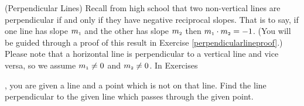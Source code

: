 {
\label{perpendicularlines}

\noindent (Perpendicular Lines)  Recall from high school that two non-vertical lines are perpendicular if and only if they have negative reciprocal slopes.  That is to say, if one line has slope $m_{\mbox{\tiny$1$}}$ and the other has slope $m_{\mbox{\tiny$2$}}$ then $m_{\mbox{\tiny$1$}} \cdot m_{\mbox{\tiny$2$}} = -1$.  (You will be guided through a proof of this result in Exercise \ref{perpendicularlineproof}.)  Please note that a horizontal line is perpendicular to a vertical line and vice versa, so we assume $m_{\mbox{\tiny$1$}} \neq 0$ and $m_{\mbox{\tiny$2$}} \neq 0$. In Exercises}
{, you are given a line and a point which is not on that line.  Find the line perpendicular to the given line which passes through the given point.
}


